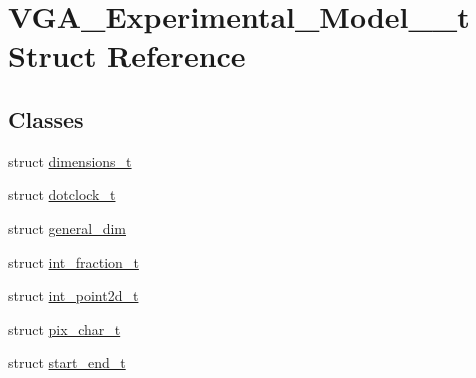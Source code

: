 \hypertarget{structVGA__Experimental__Model__1__t}{\section{V\-G\-A\-\_\-\-Experimental\-\_\-\-Model\-\_\-\_\-t Struct Reference}
\label{structVGA__Experimental__Model__1__t}
}
\subsection*{Classes}
\begin{DoxyCompactItemize}
\item 
struct \hyperlink{structVGA__Experimental__Model__1__t_1_1dimensions__t}{dimensions\-\_\-t}
\item 
struct \hyperlink{structVGA__Experimental__Model__1__t_1_1dotclock__t}{dotclock\-\_\-t}
\item 
struct \hyperlink{structVGA__Experimental__Model__1__t_1_1general__dim}{general\-\_\-dim}
\item 
struct \hyperlink{structVGA__Experimental__Model__1__t_1_1int__fraction__t}{int\-\_\-fraction\-\_\-t}
\item 
struct \hyperlink{structVGA__Experimental__Model__1__t_1_1int__point2d__t}{int\-\_\-point2d\-\_\-t}
\item 
struct \hyperlink{structVGA__Experimental__Model__1__t_1_1pix__char__t}{pix\-\_\-char\-\_\-t}
\item 
struct \hyperlink{structVGA__Experimental__Model__1__t_1_1start__end__t}{start\-\_\-end\-\_\-t}
\end{DoxyCompactItemize}
